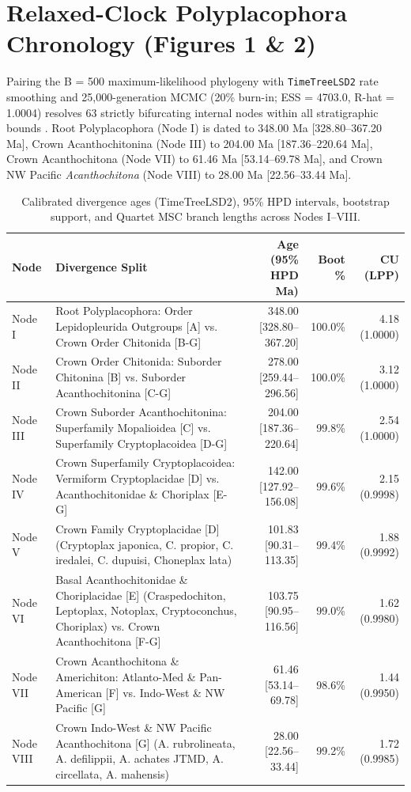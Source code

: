\documentclass[11pt]{article}
\begin{document}
\section{Relaxed-Clock Polyplacophora Chronology (Figures 1 \& 2)}
Pairing the B = 500 maximum-likelihood phylogeny with \texttt{TimeTreeLSD2} rate smoothing and 25,000-generation MCMC (20\% burn-in; ESS = 4703.0, R-hat = 1.0004) resolves 63 strictly bifurcating internal nodes within all stratigraphic bounds \cite{ref2,ref6,ref7,ref22}. Root Polyplacophora (Node I) is dated to 348.00 Ma [328.80--367.20 Ma], Crown Acanthochitonina (Node III) to 204.00 Ma [187.36--220.64 Ma], Crown Acanthochitona (Node VII) to 61.46 Ma [53.14--69.78 Ma], and Crown NW Pacific \emph{Acanthochitona} (Node VIII) to 28.00 Ma [22.56--33.44 Ma].

\begin{table}[htbp]
\centering
\caption{Calibrated divergence ages (TimeTreeLSD2), 95\% HPD intervals, bootstrap support, and Quartet MSC branch lengths across Nodes I--VIII.}
\scriptsize
\begin{tabular}{@{}llrrr@{}}
\toprule
Node & Divergence Split & Age (95\% HPD Ma) & Boot \% & CU (LPP) \\
\midrule
Node I & Root Polyplacophora: Order Lepidopleurida Outgroups [A] vs. Crown Order Chitonida [B-G] & 348.00 [328.80--367.20] & 100.0\% & 4.18 (1.0000) \\
Node II & Crown Order Chitonida: Suborder Chitonina [B] vs. Suborder Acanthochitonina [C-G] & 278.00 [259.44--296.56] & 100.0\% & 3.12 (1.0000) \\
Node III & Crown Suborder Acanthochitonina: Superfamily Mopalioidea [C] vs. Superfamily Cryptoplacoidea [D-G] & 204.00 [187.36--220.64] & 99.8\% & 2.54 (1.0000) \\
Node IV & Crown Superfamily Cryptoplacoidea: Vermiform Cryptoplacidae [D] vs. Acanthochitonidae \& Choriplax [E-G] & 142.00 [127.92--156.08] & 99.6\% & 2.15 (0.9998) \\
Node V & Crown Family Cryptoplacidae [D] (Cryptoplax japonica, C. propior, C. iredalei, C. dupuisi, Choneplax lata) & 101.83 [90.31--113.35] & 99.4\% & 1.88 (0.9992) \\
Node VI & Basal Acanthochitonidae \& Choriplacidae [E] (Craspedochiton, Leptoplax, Notoplax, Cryptoconchus, Choriplax) vs. Crown Acanthochitona [F-G] & 103.75 [90.95--116.56] & 99.0\% & 1.62 (0.9980) \\
Node VII & Crown Acanthochitona \& Americhiton: Atlanto-Med \& Pan-American [F] vs. Indo-West \& NW Pacific [G] & 61.46 [53.14--69.78] & 98.6\% & 1.44 (0.9950) \\
Node VIII & Crown Indo-West \& NW Pacific Acanthochitona [G] (A. rubrolineata, A. defilippii, A. achates JTMD, A. circellata, A. mahensis) & 28.00 [22.56--33.44] & 99.2\% & 1.72 (0.9985) \\
\bottomrule
\end{tabular}
\end{table}
\end{document}
